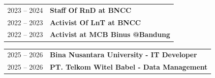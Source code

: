\begin{singlespace}

\noindent
\begin{tabular}{p{4.5cm} p{9.5cm}}
2023 -- 2024 & \textbf{Staff Of RnD at BNCC} \\
2022 -- 2023 & \textbf{Activist Of LnT at BNCC} \\
2022 -- 2023 & \textbf{Activist at MCB Binus @Bandung} \\
\end{tabular}


\noindent
\begin{tabular}{p{4.5cm} p{9.5cm}}
2025 -- 2026 & \textbf{Bina Nusantara University - IT Developer} \\
2025 -- 2026 & \textbf{PT. Telkom Witel Babel - Data Management} \\
\end{tabular}
\end{singlespace}

\newpage

